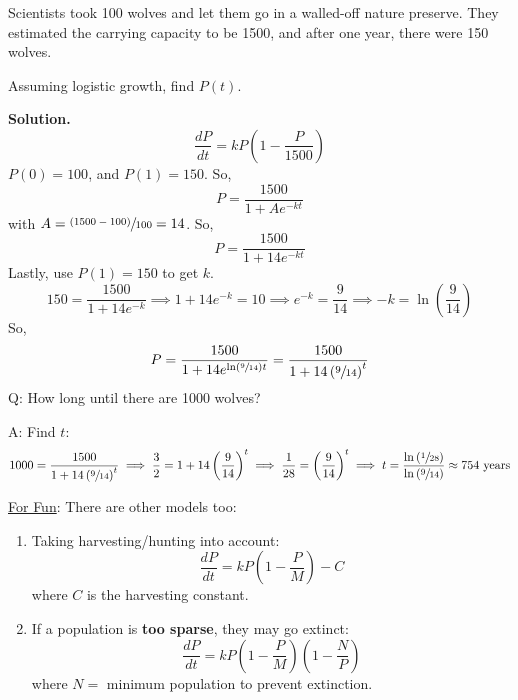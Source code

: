 \begin{Example}{}{}
    Scientists took 100 wolves and let them go in a walled-off nature preserve. They
    estimated the carrying capacity to be 1500, and after one year, there were 150 wolves.

    Assuming logistic growth, find $ P(t) $.

    \textbf{Solution.}
    \[ \frac{dP}{dt}=kP\left(1-\frac{P}{1500}\right)  \]
    $ P(0)=100 $, and $ P(1)=150 $. So,
    \[ P=\frac{1500}{1+Ae^{-kt}}  \]
    with $ A=\sfrac{(1500-100)}{100}=14  $. So,
    \[ P=\frac{1500}{1+14e^{-kt}}  \]
    Lastly, use $ P(1)=150 $ to get $ k $.
    \[ 150=\frac{1500}{1+14e^{-k}}\implies 1+14e^{-k}=10\implies e^{-k}=\frac{9}{14} \implies
        -k=\ln\left( \frac{9}{14} \right) \]
    So,
    \[ P=\frac{1500}{1+14e^{\ln\left( \sfrac{9}{14}  \right)t}} =\frac{1500}{1+14\left( \sfrac{9}{14}  \right)^t} \]
    Q\@: How long until there are 1000 wolves?

    A\@: Find $ t $:
    \[ 1000=\frac{1500}{1+14\left( \sfrac{9}{14}  \right)^t}
        \implies \frac{3}{2} =1+14\left( \frac{9}{14}  \right)^t
        \implies \frac{1}{28} =\left( \frac{9}{14} \right)^t
        \implies t=\frac{\ln\left( \sfrac{1}{28}  \right)}{\ln\left( \sfrac{9}{14}\right)}
        \approx 754\text{ years}\]
\end{Example}

\underline{For Fun}: There are other models too:
\begin{enumerate}[label=(\Roman*)]
    \item Taking harvesting/hunting into account:
          \[ \frac{dP}{dt}=kP\left( 1-\frac{P}{M} \right)-C \]
          where $ C $ is the harvesting constant.
    \item If a population is \textbf{too sparse}, they may go extinct:
          \[ \frac{dP}{dt}=kP\left( 1-\frac{P}{M} \right)\left( 1-\frac{N}{P}  \right)  \]
          where $ N= $ minimum population to prevent extinction.
\end{enumerate}
